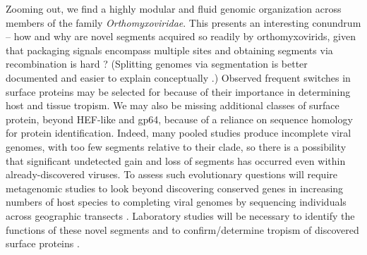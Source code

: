 \documentclass[11pt,twocolumn]{article}
\begin{document}
Zooming out, we find a highly modular and fluid genomic organization across members of the family \textit{Orthomyxoviridae}. This presents an interesting conundrum -- how and why are novel segments acquired so readily by orthomyxovirids, given that packaging signals encompass multiple sites \citep{baker_influenza_2014} and obtaining segments via recombination is hard \citep{chare_phylogenetic_2003}? (Splitting genomes via segmentation is better documented \citep{kondo_orchid_2006,qin_tick-borne_2014} and easier to explain conceptually \citep{ke_phylodynamic_2013}.) Observed frequent switches in surface proteins may be selected for because of their importance in determining host and tissue tropism. We may also be missing additional classes of surface protein, beyond HEF-like and gp64, because of a reliance on sequence homology for protein identification. Indeed, many pooled studies produce incomplete viral genomes, with too few segments relative to their clade, so there is a possibility that significant undetected gain and loss of segments has occurred even within already-discovered viruses. To assess such evolutionary questions will require metagenomic studies to look beyond discovering conserved genes in increasing numbers of host species to completing viral genomes by sequencing individuals across geographic transects \citep{batson_single_2021}. Laboratory studies will be necessary to identify the functions of these novel segments and to confirm/determine tropism of discovered surface proteins \citep{arunkumar_functionality_2021}.
\end{document}
